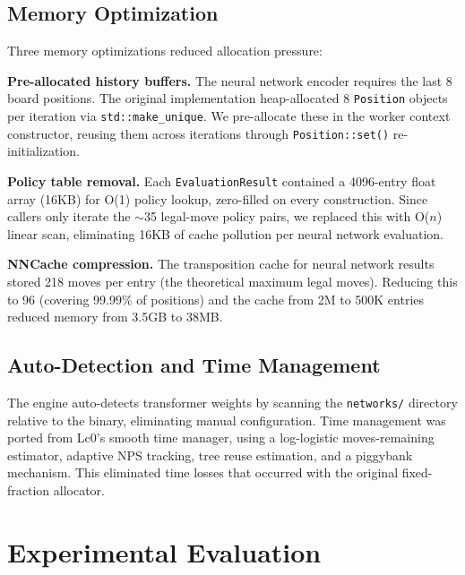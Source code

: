 \documentclass{svproc}
\begin{document}
\subsection{Memory Optimization}

Three memory optimizations reduced allocation pressure:

\textbf{Pre-allocated history buffers.} The neural network encoder requires the last 8 board positions. The original implementation heap-allocated 8 \texttt{Position} objects per iteration via \texttt{std::make\_unique}. We pre-allocate these in the worker context constructor, reusing them across iterations through \texttt{Position::set()} re-initialization.

\textbf{Policy table removal.} Each \texttt{EvaluationResult} contained a 4096-entry float array (16KB) for O(1) policy lookup, zero-filled on every construction. Since callers only iterate the $\sim$35 legal-move policy pairs, we replaced this with O($n$) linear scan, eliminating 16KB of cache pollution per neural network evaluation.

\textbf{NNCache compression.} The transposition cache for neural network results stored 218 moves per entry (the theoretical maximum legal moves). Reducing this to 96 (covering 99.99\% of positions) and the cache from 2M to 500K entries reduced memory from 3.5GB to 38MB.

\subsection{Auto-Detection and Time Management}

The engine auto-detects transformer weights by scanning the \texttt{networks/} directory relative to the binary, eliminating manual configuration. Time management was ported from Lc0's smooth time manager, using a log-logistic moves-remaining estimator, adaptive NPS tracking, tree reuse estimation, and a piggybank mechanism. This eliminated time losses that occurred with the original fixed-fraction allocator.



\FloatBarrier
\section{Experimental Evaluation}
\label{sec:evaluation}
\end{document}
